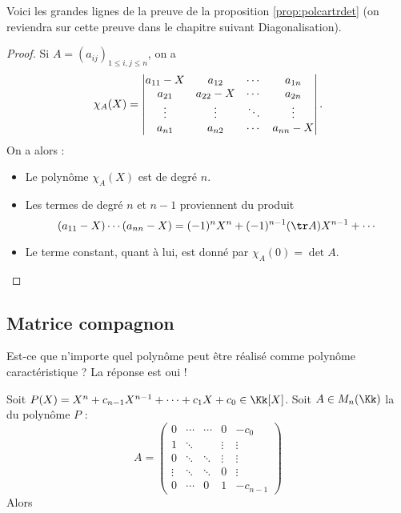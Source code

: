 \documentclass[11pt, class=report,crop=false]{standalone}
\begin{document}
Voici les grandes lignes de la preuve de la proposition \ref{prop:polcartrdet} (on reviendra sur cette preuve dans le chapitre suivant \og{}Diagonalisation\fg{}).
\begin{proof}
Si $A=(a_{ij})_{1\le i,j\le n}$, on a
$$\chi_A(X)
= \begin{vmatrix}
a_{11}-X&a_{12}&\cdots&a_{1n}\cr 
a_{21}&a_{22}-X& \cdots & a_{2n} \cr
\vdots& \vdots & \ddots &  \vdots \cr 
a_{n1}&a_{n2} &\cdots&a_{nn}-X\end{vmatrix}.$$
On a alors :
\begin{itemize}
  \item Le polynôme $\chi_A(X)$ est de degré $n$.
  \item Les termes de degré $n$ et $n-1$ proviennent du produit 
$$(a_{11}-X)\cdots(a_{nn}-X)=(-1)^nX^n+(-1)^{n-1}(\tr A)X^{n-1}+\cdots$$   
  \item Le terme constant, quant à lui, est donné par $\chi_A(0)=\det A$.
\end{itemize}
\end{proof}



\subsection{Matrice compagnon}


Est-ce que n'importe quel polynôme peut être réalisé comme polynôme caractéristique ? La réponse est oui !

\begin{proposition}
Soit $P(X) = X^n+c_{n-1}X^{n-1}+ \cdots +c_1X+c_0 \in \Kk[X]$.
Soit $A \in M_n(\Kk)$ la  du polynôme $P$ :
$$A = 
\begin{pmatrix}
0&\cdots&\cdots&0&-c_{0}\\
1&\ddots&&\vdots&\vdots\\
0&\ddots&\ddots&\vdots&\vdots\\
\vdots&\ddots&\ddots&0&\vdots\\
0&\cdots&0&1&-c_{n-1}
\end{pmatrix}$$
Alors 
\end{proposition}
\end{document}
